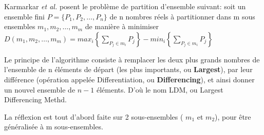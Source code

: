 \documentclass[a4paper,12pt]{report}
\theoremstyle{plain}				%
\theoremstyle{definition}				%
\begin{document}
Karmarkar \emph{et al.}
\cite{karmarkar1982differencing} posent le problème de partition
d'ensemble suivant: soit un ensemble fini
$P=\{P_1, P_2, \ldots, P_n\}$ de n nombres réels à partitionner dans m
sous ensembles $m_1, m_2, \ldots, m_m$ de manière à minimiser
$D(m_1, m_2, \ldots, m_m) = max_i \left\{ \sum_{P_j \in m_i}P_j
\right\} - min_i \left\{ \sum_{P_j \in m_i}P_j \right\}$

Le principe de l'algorithme consiste à remplacer les deux plus grands
nombres de l'ensemble de n éléments de départ (les plus importants, ou
\textbf{Largest}), par leur différence (opération appelée
Differentiation, ou \textbf{Differencing}), et ainsi donner un nouvel
ensemble de $n-1$ éléments.
D'où le nom LDM, ou Largest Differencing Methd.


La réflexion est tout d'abord faite sur 2 sous-ensembles ( $m_1$ et
$m_2$), pour être généralisée à m sous-ensembles.
\end{document}
